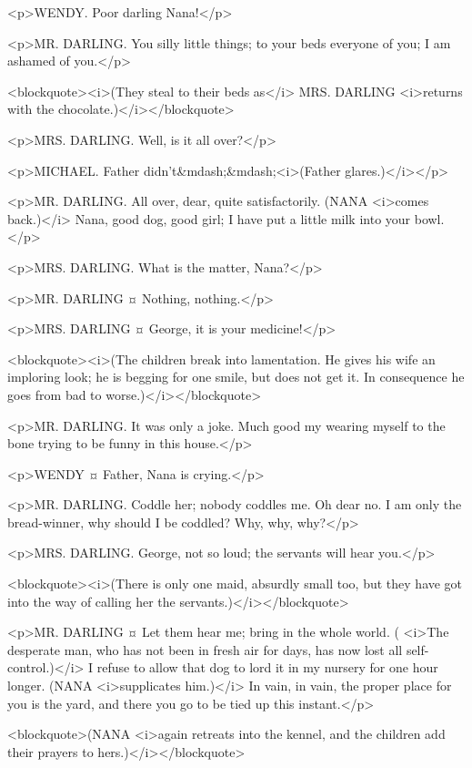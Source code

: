 <p>WENDY. Poor darling Nana!</p>

<p>MR. DARLING. You silly little things; to your beds everyone of you; I am ashamed of you.</p>

<blockquote><i>(They steal to their beds as</i> MRS. DARLING <i>returns with the chocolate.)</i></blockquote>

<p>MRS. DARLING. Well, is it all over?</p>

<p>MICHAEL. Father didn't&mdash;&mdash;<i>(Father glares.)</i></p>

<p>MR. DARLING. All over, dear, quite satisfactorily. (NANA <i>comes back.)</i> Nana, good dog, good girl; I have put a little milk into your bowl.
</p>

<p>MRS. DARLING. What is the matter, Nana?</p>

<p>MR. DARLING ¤
Nothing, nothing.</p>

<p>MRS. DARLING ¤
George, it is your medicine!</p>

<blockquote><i>(The children break into lamentation. He gives his wife an imploring look; he is begging for one smile, but does not get it. In consequence he goes from bad to worse.)</i></blockquote>

<p>MR. DARLING. It was only a joke. Much good my wearing myself to the bone trying to be funny in this house.</p>

<p>WENDY ¤
Father, Nana is crying.</p>

<p>MR. DARLING. Coddle her; nobody coddles me. Oh dear no. I am only the bread-winner, why should I be coddled? Why, why, why?</p>

<p>MRS. DARLING. George, not so loud; the servants will hear you.</p>

<blockquote><i>(There is only one maid, absurdly small too, but they have got into the way of calling her the servants.)</i></blockquote>

<p>MR. DARLING ¤
Let them hear me; bring in the whole world. ( <i>The desperate man, who has not been in fresh air for days, has now lost all self-control.)</i> I refuse to allow that dog to lord it in my nursery for one hour longer. (NANA <i>supplicates him.)</i> In vain, in vain, the proper place for you is the yard, and there you go to be tied up this instant.</p>

<blockquote>(NANA <i>again retreats into the kennel, and the children add their prayers to hers.)</i></blockquote>

